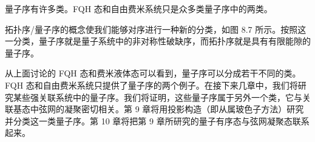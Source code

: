 \begin{keypoints}
\item 量子序有许多类。FQH 态和自由费米系统只是众多类量子序中的两类。
\end{keypoints}

拓扑序/量子序的概念使我们能够对序进行一种新的分类，如图 8.7 所示。按照这一分类，量子序就是量子系统中的非对称性破缺序，而拓扑序就是具有有限能隙的量子序。

从上面讨论的 FQH 态和费米液体态可以看到，量子序可以分成若干不同的类。FQH 态和自由费米系统只提供了量子序的两个例子。在接下来几章中，我们将研究某些强关联系统中的量子序。我们将证明，这些量子序属于另外一个类，它与关联基态中弦网的凝聚密切相关。第 9 章将用投影构造（即从属玻色子方法）研究并分类这一类量子序。第 10 章将把第 9 章所研究的量子有序态与弦网凝聚态联系起来。
